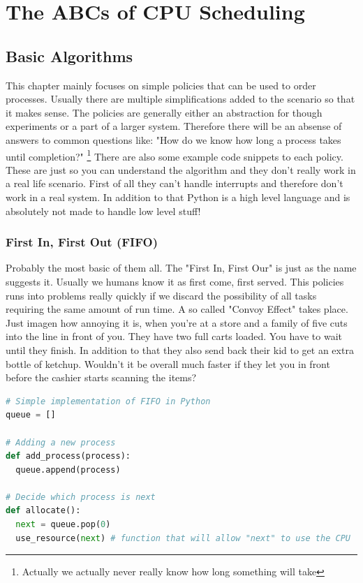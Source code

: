 \documentclass{report}
\begin{document}
\part{The ABCs of CPU Scheduling}

\chapter{Basic Algorithms}

This chapter mainly focuses on simple policies that can be used to order processes.
Usually there are multiple simplifications added to the scenario so that it makes sense.
The policies are generally either an abstraction for though experiments or a part of a larger system.
Therefore there will be an absense of answers to common questions like: "How do we know how long a process takes until completion?" \footnote{Actually we actually never really know how long something will take}
There are also some example code snippets to each policy.
These are just so you can understand the algorithm and they don't really work in a real life scenario.
First of all they can't handle interrupts and therefore don't work in a real system.
In addition to that Python is a high level language and is absolutely not made to handle low level stuff!

\section{First In, First Out (FIFO)}

Probably the most basic of them all.
The "First In, First Our" is just as the name suggests it. 
Usually we humans know it as first come, first served. 
This policies runs into problems really quickly if we discard the possibility of all tasks requiring the same amount of run time. 
A so called "Convoy Effect" takes place. 
Just imagen how annoying it is, when you're at a store and a family of five cuts into the line in front of you. 
They have two full carts loaded. You have to wait until they finish. 
In addition to that they also send back their kid to get an extra bottle of ketchup. 
Wouldn't it be overall much faster if they let you in front before the cashier starts scanning the items?

\begin{lstlisting}[language=Python, style=colorEX, label=cd:fifo-python]
# Simple implementation of FIFO in Python
queue = []

# Adding a new process
def add_process(process):
  queue.append(process)

# Decide which process is next
def allocate():
  next = queue.pop(0)
  use_resource(next) # function that will allow "next" to use the CPU
\end{lstlisting}
\end{document}
